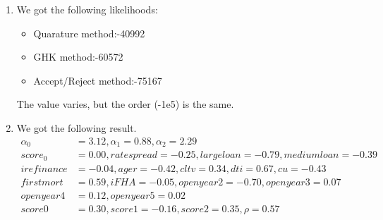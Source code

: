 \documentclass{article}
\begin{document}
\begin{enumerate}
\item We got the following likelihoods: 
  \begin{itemize}
  \item  Quarature method:-40992
  \item  GHK method:-60572
  \item  Accept/Reject method:-75167
  \end{itemize}
  The value varies, but the order (-1e5) is the same.  
\item We got the following result. 
  \begin{align*}
    \alpha_0 &= 3.12, \alpha_1 = 0.88, \alpha_2 = 2.29 \\
    score_0 &= 0.00, rate spread = -0.25, large loan = -0.79, medium loan = -0.39 \\ 
    i refinance &= -0.04, age r = -0.42, cltv = 0.34, dti = 0.67, cu = -0.43 \\
    first mort &= 0.59, i FHA = -0.05, open year 2 = -0.70,open year 3 = 0.07 \\ 
    open year 4 &= 0.12, open year 5 =0.02 \\
    score0  &= 0.30, score1 = -0.16, score2 = 0.35, \rho = 0.57 
  \end{align*}
\end{enumerate}
\end{document}
